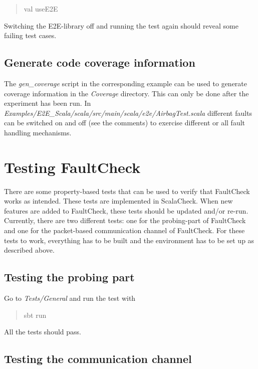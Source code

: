 \begin{quote}
val useE2E
\end{quote}

Switching the E2E-library off and running the test again should reveal
some failing test cases.

\subsection{Generate code coverage
information}\label{generate-code-coverage-information}

The \emph{gen\_coverage} script in the corresponding example can be used
to generate coverage information in the \emph{Coverage} directory. This
can only be done after the experiment has been run. In
\emph{Examples/E2E\_Scala/scala/src/main/scala/e2e/AirbagTest.scala}
different faults can be switched on and off (see the comments) to
exercise different or all fault handling mechanisms.

\section{Testing FaultCheck}\label{testing-faultcheck}

There are some property-based tests that can be used to verify that
FaultCheck works as intended. These tests are implemented in ScalaCheck.
When new features are added to FaultCheck, these tests should be updated
and/or re-run. Currently, there are two different tests: one for the
probing-part of FaultCheck and one for the packet-based communication
channel of FaultCheck. For these tests to work, everything has to be
built and the environment has to be set up as described above.

\subsection{Testing the probing part}\label{testing-the-probing-part}

Go to \emph{Tests/General} and run the test with

\begin{quote}
sbt run
\end{quote}

All the tests should pass.

\subsection{Testing the communication
channel}\label{testing-the-communication-channel}

